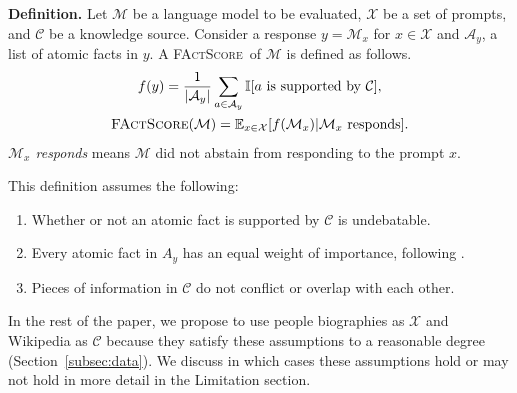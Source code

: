 \documentclass[11pt]{article}
\newcommand{\ours}{\textsc{FActScore}}
\newcommand{\myskip}[1]{}
\newcommand{\sewon}[1]{\textcolor{magenta}{[Sewon: #1]}
}
\newcommand{\pw}[1]{%
}
\begin{document}
\vspace{.3em}
\noindent
\textbf{Definition.}
Let $\mathcal{M}$ be a language model to be evaluated,
$\mathcal{X}$ be a set of prompts,
and $\mathcal{C}$ be a knowledge source.
Consider a response $y = \mathcal{M}_x$ for $x \in \mathcal{X}$
and $\mathcal{A}_y$, a list of atomic facts in $y$.
A \ours\ of $\mathcal{M}$ is defined as follows.
\begin{align*}
    \begin{gathered}
        f(y) = \frac{1}{|\mathcal{A}_y|}\sum_{a \in \mathcal{A}_y}\mathbb{I}[a \text{~is supported by~} \mathcal{C}], \\
        \text{\ours}(\mathcal{M}) =
        \mathbb{E}_{x \in \mathcal{X}}[f(\mathcal{M}_x) | \mathcal{M}_x\text{~responds}].
    \end{gathered}
\end{align*} {\em $\mathcal{M}_x$ responds} means $\mathcal{M}$ did not abstain from responding to the prompt $x$.
\myskip{
\vspace{10em}
Let $x$ be a long-form generation from an LM that conveys a series of atomic facts, i.e., pieces of information, $x_1, x_2, \cdots, x_n$, and $\mathcal{C}$ be a knowledge source.
We define \textbf{\ours} as a function that maps $x$ and $\mathcal{C}$ into:
\begin{equation*}
    \text{\ours}(x, \mathcal{C}) = \frac{1}{n} \sum_{i=1}^n \mathbb{I}[x_i \text{~is supported by~} \mathcal{C}].   
\end{equation*}
\begin{equation*}
    \text{\ours}(\mathcal{M}, \mathcal{C}) = \frac{
        \sum_{x \in \mathcal{X}} f(x, \mathcal{C}) \mathrm{DoesRespond}(x)
    }{
        \sum_{x \in \mathcal{X}} \mathrm{DoesRespond}(x)
    }
\end{equation*}}
This definition assumes the following:
\vspace{-.3em}
\begin{enumerate}[leftmargin=15pt]\itemsep -.2em
    \item Whether or not an atomic fact is supported by $\mathcal{C}$ is undebatable.
    \item Every atomic fact in $A_y$ has an equal weight of importance, following \citet{krishna-etal-2023-longeval}. 
    \item Pieces of information in $\mathcal{C}$ do not conflict or overlap with each other.
\end{enumerate}
In the rest of the paper, we propose to use people biographies as $\mathcal{X}$ and Wikipedia as $\mathcal{C}$ because they satisfy these assumptions to a reasonable degree (Section~\ref{subsec:data}).
We discuss in which cases these assumptions hold or may not hold in more detail in the Limitation section. %
\end{document}
